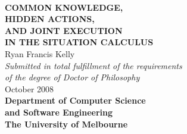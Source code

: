 %
%
%
%








\begin{titlepage}
\begin{center}
\ \\
\vspace{2cm}
{\bf\LARGE  COMMON KNOWLEDGE, }\\ \vspace{0.5cm} %
{\bf\LARGE  HIDDEN ACTIONS, }\\ \vspace{0.5cm} %
{\bf\LARGE  AND JOINT EXECUTION }\\ \vspace{0.5cm} %
{\bf\LARGE  IN THE SITUATION CALCULUS } \\ %
\vspace{2cm}
{\LARGE      Ryan Francis Kelly       }\\
\vspace{5cm}
{\em\large Submitted in total fulfillment of the requirements}\\ \vspace{0.1cm}
{\em\large        of the degree of Doctor of Philosophy     }\\
\vspace{0.5cm}
{\Large             October 2008        }\\
\vspace{2.5cm}
{\bf\large Department of Computer Science\\ and Software Engineering}\\ \vspace{0.5cm}
{\bf\Large        The University of Melbourne     }\\
\vspace{0.5cm}
\end{center}
\end{titlepage}

\cleardoublepage




